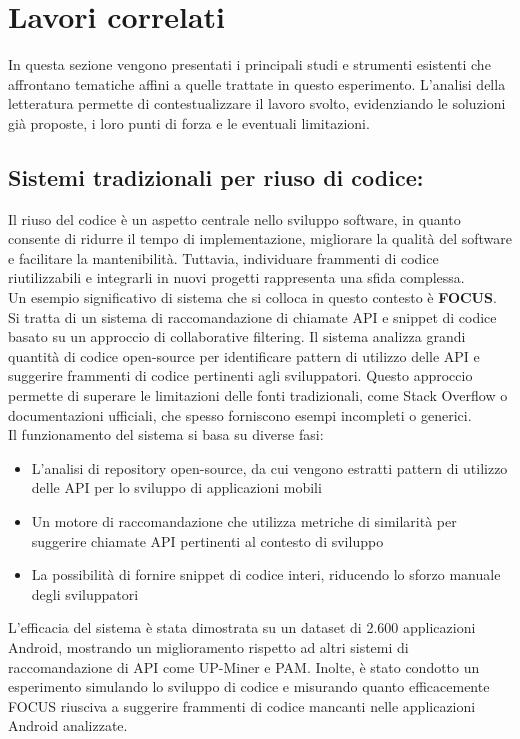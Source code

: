 \documentclass{article}
\begin{document}
\section{Lavori correlati}
In questa sezione vengono presentati i principali studi e strumenti esistenti che affrontano tematiche affini a quelle trattate in questo esperimento. L'analisi della letteratura permette di contestualizzare il lavoro svolto, evidenziando le soluzioni già proposte, i loro punti di forza e le eventuali limitazioni.

\subsection{Sistemi tradizionali per riuso di codice:}
Il riuso del codice è un aspetto centrale nello sviluppo software, in quanto consente di ridurre il tempo di implementazione, migliorare la qualità del software e facilitare la mantenibilità. Tuttavia, individuare frammenti di codice riutilizzabili e integrarli in nuovi progetti rappresenta una sfida complessa.\\
Un esempio significativo di sistema che si colloca in questo contesto è \textbf{FOCUS}\cite{nguyen2021recommending}. Si tratta di un sistema di raccomandazione di chiamate API e snippet di codice basato su un approccio di collaborative filtering. Il sistema analizza grandi quantità di codice open-source per identificare pattern di utilizzo delle API e suggerire frammenti di codice pertinenti agli sviluppatori. Questo approccio permette di superare le limitazioni delle fonti tradizionali, come Stack Overflow o documentazioni ufficiali, che spesso forniscono esempi incompleti o generici.\\
Il funzionamento del sistema si basa su diverse fasi:
\begin{itemize}
    \item L’analisi di repository open-source, da cui vengono estratti pattern di utilizzo delle API per lo sviluppo di applicazioni mobili
    \item Un motore di raccomandazione che utilizza metriche di similarità per suggerire chiamate API pertinenti al contesto di sviluppo
    \item La possibilità di fornire snippet di codice interi, riducendo lo sforzo manuale degli sviluppatori
\end{itemize}
L’efficacia del sistema è stata dimostrata su un dataset di 2.600 applicazioni Android, mostrando un miglioramento rispetto ad altri sistemi di raccomandazione di API come UP-Miner\cite{wang2013mining} e PAM\cite{fowkes2016parameter}. Inolte, è stato condotto un esperimento simulando lo sviluppo di codice e misurando quanto efficacemente FOCUS riusciva a suggerire frammenti di codice mancanti nelle applicazioni Android analizzate.\\
\end{document}
